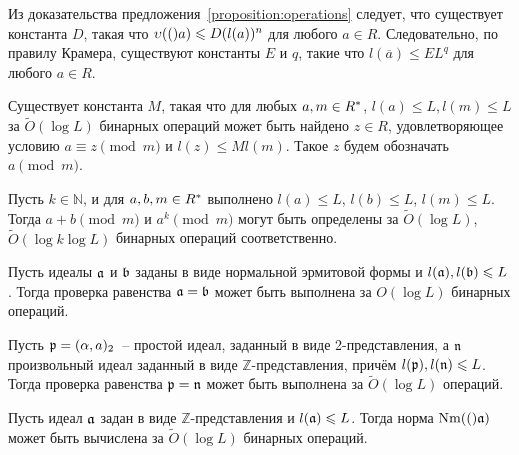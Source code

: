 \documentclass[_00_autoref.tex]{subfiles}
\begin{document}
\begin{remark}
    Из доказательства предложения~\ref{proposition:operations} следует, что существует константа $D$, такая что $\upsilon(()a) \leqslant D (l(a))^n$ для любого $a \in R$.
    Следовательно, по правилу Крамера, существуют константы $E$ и $q$, такие что $l(\overline{a}) \leq E L^q$ для любого $a \in R$.
\end{remark}

\begin{proposition}\label{proposition:mod}
    Существует константа $M$, такая что для любых $a, m \in R^{*}$, $l(a) \leq L, l(m) \leq L$ за $\tilde{O}(\log L)$ бинарных операций может быть найдено $z \in R$, удовлетворяющее условию $a \equiv z \pmod{m}$ и $l(z) \leq M l(m)$.
    Такое $z$ будем обозначать $a \pmod{m}$.
\end{proposition}

\begin{corollary}\label{corollary:mod}
    Пусть $k \in \mathbb{N}$, и для $a, b, m \in R^{*}$ выполнено $l(a) \leq L$, $l(b) \leq L$, $l(m) \leq L$.
    Тогда $a + b \pmod{m}$ и $a^k \pmod{m}$ могут быть определены за $\tilde{O}(\log L)$, $\tilde{O}(\log k \log L)$  бинарных операций соответственно.
\end{corollary}

\begin{proposition}\label{proposition:equality}
    Пусть идеалы $\mathfrak{a}$ и $\mathfrak{b}$ заданы в виде нормальной эрмитовой формы и $l(\mathfrak{a}), l(\mathfrak{b}) \leqslant L$.
    Тогда проверка равенства $\mathfrak{a} = \mathfrak{b}$ может быть выполнена за $O(\log L)$ бинарных операций.
\end{proposition}

\begin{proposition}\label{proposition:particular_equality}
    Пусть $\mathfrak{p} = (\alpha, a)_2$~-- простой идеал, заданный в виде 2-представления, а $\mathfrak{n}$ произвольный идеал заданный в виде $\mathbb{Z}$-представления, причём $l(\mathfrak{p}), l(\mathfrak{n}) \leqslant L$.
    Тогда проверка равенства $\mathfrak{p} = \mathfrak{n}$ может быть выполнена за $\tilde{O}(\log L)$ операций.
\end{proposition}

\begin{proposition}\label{proposition:norm}
    Пусть идеал $\mathfrak{a}$ задан в виде $\mathbb{Z}$-представления и $l(\mathfrak{a}) \leqslant L$.
    Тогда норма $\textrm{Nm}(()\mathfrak{a})$ может быть вычислена за $\tilde{O}(\log L)$ бинарных операций.
\end{proposition}
\end{document}
